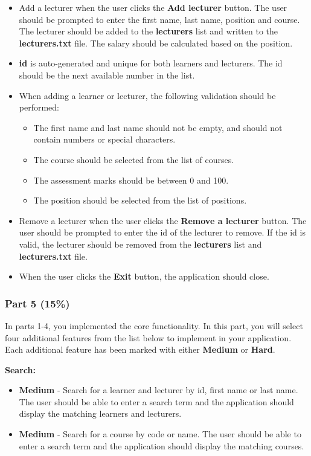 \documentclass{article}
\begin{document}
\begin{itemize}
\begin{itemize}
        \item Add a lecturer when the user clicks the \textbf{Add lecturer} button. The user should be prompted to enter the first name, last name, position and course. The lecturer should be added to the \textbf{lecturers} list and written to the \textbf{lecturers.txt} file. The salary should be calculated based on the position.
        \item \textbf{id} is auto-generated and unique for both learners and lecturers. The id should be the next available number in the list.
        \item When adding a learner or lecturer, the following validation should be performed:
        \begin{itemize}
            \item The first name and last name should not be empty, and should not contain numbers or special characters.
            \item The course should be selected from the list of courses.
            \item The assessment marks should be between 0 and 100.
            \item The position should be selected from the list of positions.
        \end{itemize}
        \item Remove a lecturer when the user clicks the \textbf{Remove a lecturer} button. The user should be prompted to enter the id of the lecturer to remove. If the id is valid, the lecturer should be removed from the \textbf{lecturers} list and \textbf{lecturers.txt} file.
        \item When the user clicks the \textbf{Exit} button, the application should close.
    \end{itemize}
\end{itemize}

\subsubsection*{Part 5 (15\%)}

In parts 1-4, you implemented the core functionality. In this part, you will select four additional features from the list below to implement in your application. Each additional feature has been marked with either \textbf{Medium} or \textbf{Hard}.

\textbf{Search:}
\begin{itemize}
    \item \textbf{Medium} - Search for a learner and lecturer by id, first name or last name. The user should be able to enter a search term and the application should display the matching learners and lecturers. 
    \item \textbf{Medium} - Search for a course by code or name. The user should be able to enter a search term and the application should display the matching courses.
\end{itemize}
\end{document}
